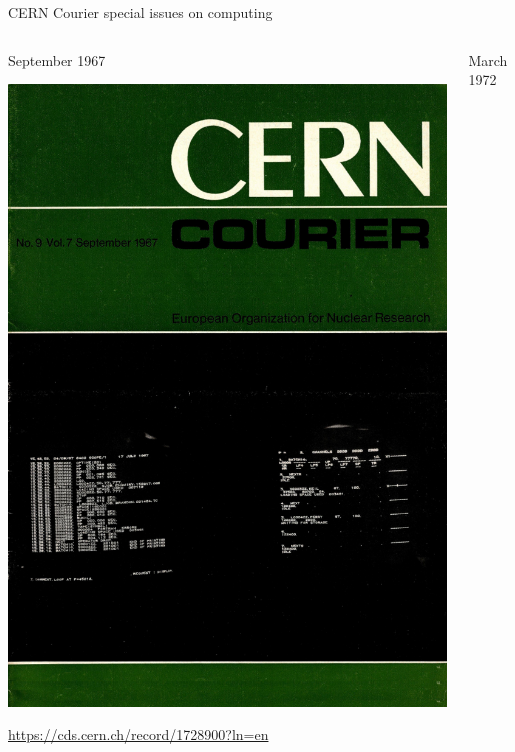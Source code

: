 \documentclass[aspectratio=169]{beamer}
\begin{document}



\begin{frame}{CERN Courier special issues on computing}
\large
\begin{columns}
\begin{center}
September 1967

\vspace{0.2 cm}
\includegraphics[width=0.55\linewidth]{cern-courier-1.png}

\vspace{0.2 cm}
\scriptsize
\textcolor{blue}{\url{https://cds.cern.ch/record/1728900?ln=en}}
\end{center}

\begin{center}
March 1972


\end{center}
\end{columns}
\end{frame}
\end{document}
